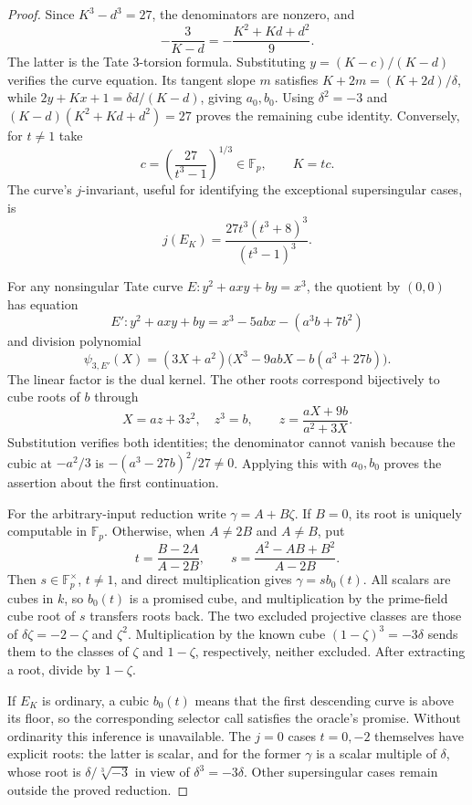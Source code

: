 \documentclass[11pt]{article}
\theoremstyle{definition}
\theoremstyle{remark}
\begin{document}
\begin{proof}
Since $K^3-d^3=27$, the denominators are nonzero, and
\[
 -\frac3{K-d}=-\frac{K^2+Kd+d^2}{9}.
\]
The latter is the Tate $3$-torsion formula.  Substituting
$y=(K-c)/(K-d)$ verifies the curve equation.  Its tangent
slope $m$ satisfies
$K+2m=(K+2d)/\delta$, while
$2y+Kx+1=\delta d/(K-d)$, giving $a_0,b_0$.
Using $\delta^2=-3$ and
$(K-d)(K^2+Kd+d^2)=27$ proves the remaining cube identity.
Conversely, for $t\ne1$ take
\[
 c=\left(\frac{27}{t^3-1}\right)^{1/3}\in\mathbb F_p,
 \qquad K=tc.
\]
The curve's $j$-invariant, useful for identifying the exceptional
supersingular cases, is
\[
 j(E_K)=\frac{27t^3(t^3+8)^3}{(t^3-1)^3}.
\]

For any nonsingular Tate curve $E:y^2+axy+by=x^3$, the quotient
by $(0,0)$ has equation
\[
 E':y^2+axy+by=x^3-5abx-(a^3b+7b^2)
\]
and division polynomial
\[
 \psi_{3,E'}(X)=(3X+a^2)
       \bigl(X^3-9abX-b(a^3+27b)\bigr).
\]
The linear factor is the dual kernel.  The other roots correspond
bijectively to cube roots of $b$ through
\[
 X=az+3z^2,\quad z^3=b,
 \qquad z=\frac{aX+9b}{a^2+3X}.
\]
Substitution verifies both identities; the denominator cannot
vanish because the cubic at $-a^2/3$ is
$-(a^3-27b)^2/27\ne0$.  Applying this with $a_0,b_0$ proves
the assertion about the first continuation.

For the arbitrary-input reduction write $\gamma=A+B\zeta$.
If $B=0$, its root is uniquely computable in $\mathbb F_p$.
Otherwise, when $A\ne2B$ and $A\ne B$, put
\[
 t=\frac{B-2A}{A-2B},\qquad
 s=\frac{A^2-AB+B^2}{A-2B}.
\]
Then $s\in\mathbb F_p^\times$, $t\ne1$, and direct
multiplication gives $\gamma=s b_0(t)$.  All scalars are
cubes in $k$, so $b_0(t)$ is a promised cube, and multiplication
by the prime-field cube root of $s$ transfers roots back.
The two excluded projective classes are those of
$\delta\zeta=-2-\zeta$ and $\zeta^2$.  Multiplication by the
known cube $(1-\zeta)^3=-3\delta$ sends them to the classes
of $\zeta$ and $1-\zeta$, respectively, neither excluded.
After extracting a root, divide by $1-\zeta$.

If $E_K$ is ordinary, a cubic $b_0(t)$ means that the first
descending curve is above its floor, so the corresponding
selector call satisfies the oracle's promise.  Without
ordinarity this inference is unavailable.  The $j=0$ cases
$t=0,-2$ themselves have explicit roots: the latter is scalar,
and for the former $\gamma$ is a scalar multiple of $\delta$,
whose root is $\delta/\sqrt[3]{-3}$ in view of
$\delta^3=-3\delta$.  Other supersingular cases remain outside
the proved reduction.
\end{proof}
\end{document}
